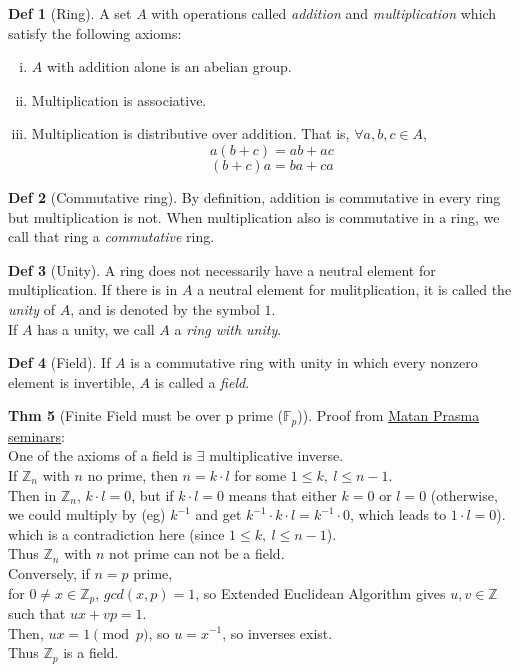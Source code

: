 \documentclass{article}
\theoremstyle{definition}
\newtheorem{definition}{Def}[section]
\newtheorem{theorem}[definition]{Thm}
\begin{document}
\begin{definition}[Ring]
    A set $A$ with operations called \emph{addition} and \emph{multiplication} which satisfy the following axioms:
    \begin{enumerate}[i.]
	\item $A$ with addition alone is an abelian group.
	\item Multiplication is associative.
	\item Multiplication is distributive over addition. That is, $\forall a,b,c \in A$,
	    $$a(b+c) = ab + ac$$
	    $$(b+c)a = ba + ca$$
    \end{enumerate}
\end{definition}

\begin{definition}[Commutative ring]
    By definition, addition is commutative in every ring but multiplication is not. When multiplication also is commutative in a ring, we call that ring a \emph{commutative} ring.
\end{definition}

\begin{definition}[Unity]
    A ring does not necessarily have a neutral element for multiplication. If there is in $A$ a neutral element for mulitplication, it is called the \emph{unity} of $A$, and is denoted by the symbol $1$.
    \\
    If $A$ has a unity, we call $A$ a \emph{ring with unity}.
\end{definition}

\begin{definition}[Field]
    If $A$ is a commutative ring with unity in which every nonzero element is invertible, $A$ is called a \emph{field}.
\end{definition}

\begin{theorem}[Finite Field must be over p prime ($\mathbb{F}_p$)]
    Proof from \href{https://github.com/aragonzkresearch/blog/blob/main/pdf/Aragon_Math_Seminar.pdf}{Matan Prasma seminars}:\\
    One of the axioms of a field is $\exists$ multiplicative inverse.\\
    If $\mathbb{Z}_n$ with $n$ no prime, then $n= k \cdot l$ for some $1 \leq k,~l \leq n-1$.\\
    Then in $\mathbb{Z}_n$, $k \cdot l = 0$, but if $k \cdot l=0$ means that either $k=0$ or $l=0$ (otherwise, we could multiply by (eg) $k^{-1}$ and get $k^{-1} \cdot k \cdot l = k^{-1} \cdot 0$, which leads to $1 \cdot l = 0$).\\
    which is a contradiction here (since $1 \leq k,~l \leq n-1$).\\
    Thus $\mathbb{Z}_n$ with $n$ not prime can not be a field.\\
    Conversely, if $n = p$ prime,\\
    for $0 \neq x \in \mathbb{Z}_p$, $gcd(x, p)=1$, so Extended Euclidean Algorithm gives $u, v \in \mathbb{Z}$ such that $u x + v p = 1$.\\
    Then, $ux=1 \pmod p$, so $u=x^{-1}$, so inverses exist.\\
    Thus $\mathbb{Z}_p$ is a field.
\end{theorem}
\end{document}
